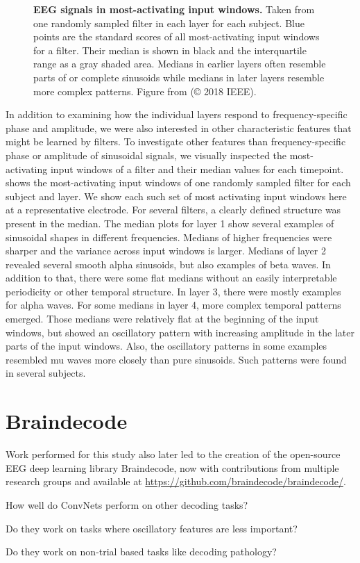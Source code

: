 \begin{figure}[h!tb]
    \caption[EEG signals in most-activating windows. per-electrode class prototypes]{
\textbf{EEG signals in most-activating input windows.} Taken from one randomly sampled filter in each layer for each subject. Blue points are the standard scores of all most-activating input windows for a filter. Their median is shown in black and the interquartile range as a gray shaded area. Medians in earlier layers often resemble parts of or complete sinusoids while medians in later layers resemble more complex
patterns. Figure from \citet{hartmann2018hierarchical} (© 2018 IEEE). 
    }\label{maximally-activating-units-fig}
\end{figure}



    In addition to examining how the individual layers respond to
frequency-specific phase and amplitude, we were also interested in other
characteristic features that might be learned by filters. To investigate
other features than frequency-specific phase or amplitude of sinusoidal
signals, we visually inspected the most-activating input windows of a
filter and their median values for each timepoint.
 shows the
most-activating input windows of one randomly sampled filter for each
subject and layer. We show each such set of most activating input
windows here at a representative electrode.
% 
For several filters, a clearly defined structure was present in the
median. The median plots for layer 1 show several examples of sinusoidal
shapes in different frequencies. Medians of higher frequencies were
sharper and the variance across input windows is larger. Medians of
layer 2 revealed several smooth alpha sinusoids, but also examples of
beta waves. In addition to that, there were some flat medians without an
easily interpretable periodicity or other temporal structure. In layer
3, there were mostly examples for alpha waves. For some medians in layer
4, more complex temporal patterns emerged. Those medians were relatively
flat at the beginning of the input windows, but showed an oscillatory
pattern with increasing amplitude in the later parts of the input
windows. Also, the oscillatory patterns in some examples resembled mu
waves more closely than pure sinusoids. Such patterns were found in
several subjects.

\section{Braindecode}\label{braindecode}

Work performed for this study also later led to the creation of the
open-source EEG deep learning library Braindecode, now with
contributions from multiple research groups and available at
\url{https://github.com/braindecode/braindecode/}.

\begin{openbox}
\item How well do ConvNets perform on other decoding tasks?
\item Do they work on tasks where oscillatory features are less important?
\item Do they work on non-trial based tasks like decoding pathology?
\end{openbox}
